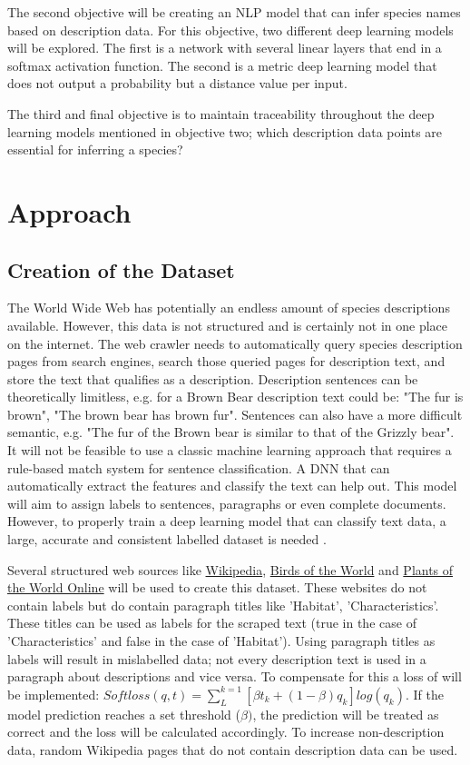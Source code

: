 \documentclass[a4paper, 12pt, oneside]{book} %
\begin{document}
The second objective will be creating an NLP model that can infer species names based on description data. 
For this objective, two different deep learning models will be explored.
The first is a network with several linear layers that end in a softmax activation function.
The second is a metric deep learning model that does not output a probability but a distance value per input.

The third and final objective is to maintain traceability throughout the deep learning models mentioned in objective two; which description data points are essential for inferring a species?


\section{Approach} 
\subsection{Creation of the Dataset}
The World Wide Web has potentially an endless amount of species descriptions available.
However, this data is not structured and is certainly not in one place on the internet.
The web crawler needs to automatically query species description pages from search engines, search those queried pages for description text, and store the text that qualifies as a description.
Description sentences can be theoretically limitless, e.g. for a Brown Bear description text could be: "The fur is brown", "The brown bear has brown fur".
Sentences can also have a more difficult semantic, e.g. "The fur of the Brown bear is similar to that of the Grizzly bear".
It will not be feasible to use a classic machine learning approach that requires a rule-based match system for sentence classification. 
A DNN that can automatically extract the features and classify the text can help out.
This model will aim to assign labels to sentences, paragraphs or even complete documents. 
However, to properly train a deep learning model that can classify text data, a large, accurate and consistent labelled dataset is needed \autocite{munappy_data_2019}.

Several structured web sources like \href{http://www.Wikipedia.com}{Wikipedia}, \href{https://birdsoftheworld.org}{Birds of the World} and \href{http://powo.science.kew.org/}{Plants of the World Online} will be used to create this dataset.
These websites do not contain labels but do contain paragraph titles like 'Habitat', 'Characteristics'. 
These titles can be used as labels for the scraped text (true in the case of 'Characteristics' and false in the case of 'Habitat').
Using paragraph titles as labels will result in mislabelled data; not every description text is used in a paragraph about descriptions and vice versa.
To compensate for this a loss of \textcite{reed_training_2015} will be implemented: \( Softloss(q, t) =  \sum_{L}^{k=1} [\beta t _k + (1- \beta )q _k]log(q _k) \).
If the model prediction reaches a set threshold (\(\beta)\), the prediction will be treated as correct and the loss will be calculated accordingly.
To increase non-description data, random Wikipedia pages that do not contain description data can be used.
\end{document}
